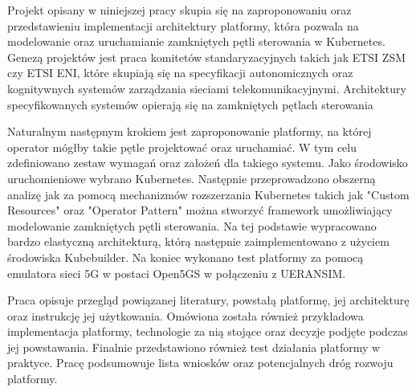 Projekt opisany w niniejszej pracy skupia się na zaproponowaniu oraz przedstawieniu implementacji architektury platformy, która pozwala na modelowanie oraz uruchamianie zamkniętych pętli sterowania w Kubernetes. Genezą projektów jest praca komitetów standaryzacyjnych takich jak ETSI ZSM czy ETSI ENI, które skupiają się na specyfikacji autonomicznych oraz kognitywnych systemów zarządzania sieciami telekomunikacyjnymi. Architektury specyfikowanych systemów opierają się na zamkniętych pętlach sterowania

Naturalnym następnym krokiem jest zaproponowanie platformy, na której operator mógłby takie pętle projektować oraz uruchamiać. W tym celu zdefiniowano zestaw wymagań oraz założeń dla takiego systemu. Jako środowisko uruchomieniowe wybrano Kubernetes. Następnie przeprowadzono obszerną analizę jak za pomocą mechanizmów rozszerzania Kubernetes takich jak "Custom Resources" oraz "Operator Pattern" można stworzyć framework umożliwiający modelowanie zamkniętych pętli sterowania. Na tej podstawie wypracowano bardzo elastyczną architekturą, którą następnie zaimplementowano z użyciem środowiska Kubebuilder. Na koniec wykonano test platformy za pomocą emulatora sieci 5G w postaci Open5GS w połączeniu z UERANSIM. 

Praca opisuje przegląd powiązanej literatury, powstałą platformę, jej architekturę oraz instrukcję jej użytkowania. Omówiona została również przykładowa implementacja platformy, technologie za nią stojące oraz decyzje podjęte podczas jej powstawania. Finalnie przedstawiono również test działania platformy w praktyce. Pracę podsumowuje lista wniosków oraz potencjalnych dróg rozwoju platformy. 